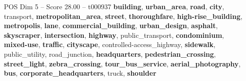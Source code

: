 \begin{textsample}{POS Dim 5 – Score 28.00 – t000937}  \label{ex:f5_pos_002}
\textbf{building}, \textbf{urban\_area}, \textbf{road}, \textbf{city}, transport, \textbf{metropolitan\_area}, \textbf{street}, \textbf{thoroughfare}, \textbf{high-rise\_building}, \textbf{metropolis}, \textbf{lane}, \textbf{commercial\_building}, \textbf{urban\_design}, \textbf{asphalt}, \textbf{skyscraper}, \textbf{intersection}, \textbf{highway}, public\_transport, \textbf{condominium}, \textbf{mixed-use}, \textbf{traffic}, \textbf{cityscape}, controlled-access\_highway, \textbf{sidewalk}, public\_utility, road\_junction, \textbf{headquarters}, \textbf{pedestrian\_crossing}, \textbf{street\_light}, \textbf{zebra\_crossing}, \textbf{tour\_bus\_service}, \textbf{aerial\_photography}, \textbf{bus}, \textbf{corporate\_headquarters}, truck, \textbf{shoulder}

\end{textsample}
